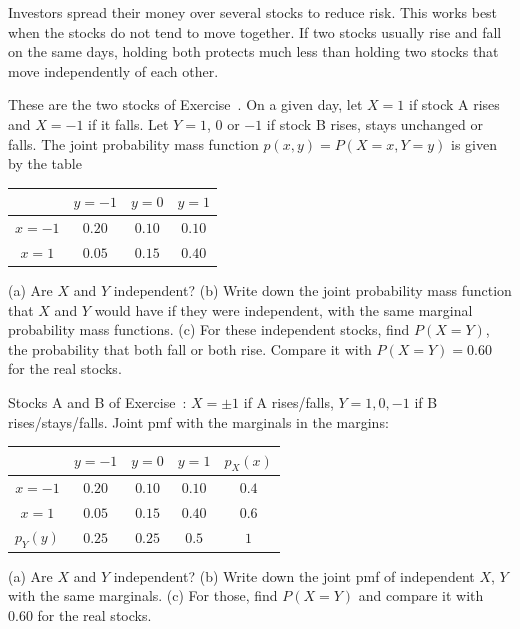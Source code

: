 
\begin{problem}
	\begin{context}
		Investors spread their money over several stocks to reduce risk. This
		works best when the stocks do not tend to move together. If two stocks
		usually rise and fall on the same days, holding both protects much less
		than holding two stocks that move independently of each other.
	\end{context}
	These are the two stocks of Exercise~. On a given day,
	let $X=1$ if stock A rises and $X=-1$ if it falls. Let $Y=1$, $0$ or $-1$
	if stock B rises, stays unchanged or falls. The joint probability mass
	function $p(x,y)=P(X=x,Y=y)$ is given by the table
	\begin{center}
		\renewcommand{\arraystretch}{1.2}
		\begin{tabular}{c|ccc}
			         & $y=-1$ & $y=0$  & $y=1$  \\
			\hline
			$x=-1$   & $0.20$ & $0.10$ & $0.10$ \\
			$x=1$    & $0.05$ & $0.15$ & $0.40$
		\end{tabular}
	\end{center}
	(a) Are $X$ and $Y$ independent?
	(b) Write down the joint probability mass function that $X$ and $Y$ would
	have if they were independent, with the same marginal probability mass
	functions.
	(c) For these independent stocks, find $P(X=Y)$, the probability that both
	fall or both rise. Compare it with $P(X=Y)=0.60$ for the real stocks.
\end{problem}

\begin{slideproblem}
	Stocks A and B of Exercise~: $X=\pm1$ if A
	rises/falls, $Y=1,0,-1$ if B rises/stays/falls. Joint pmf with the
	marginals in the margins:
	\begin{center}
		\renewcommand{\arraystretch}{1.15}
		\begin{tabular}{c|ccc|c}
			       & $y=-1$ & $y=0$  & $y=1$  & $p_X(x)$ \\
			\hline
			$x=-1$ & $0.20$ & $0.10$ & $0.10$ & $0.4$ \\
			$x=1$  & $0.05$ & $0.15$ & $0.40$ & $0.6$ \\
			\hline
			$p_Y(y)$ & $0.25$ & $0.25$ & $0.5$ & $1$
		\end{tabular}
	\end{center}
	(a) Are $X$ and $Y$ independent?
	(b) Write down the joint pmf of independent $X$, $Y$ with the same
	marginals.
	(c) For those, find $P(X=Y)$ and compare it with $0.60$ for the real
	stocks.
\end{slideproblem}

